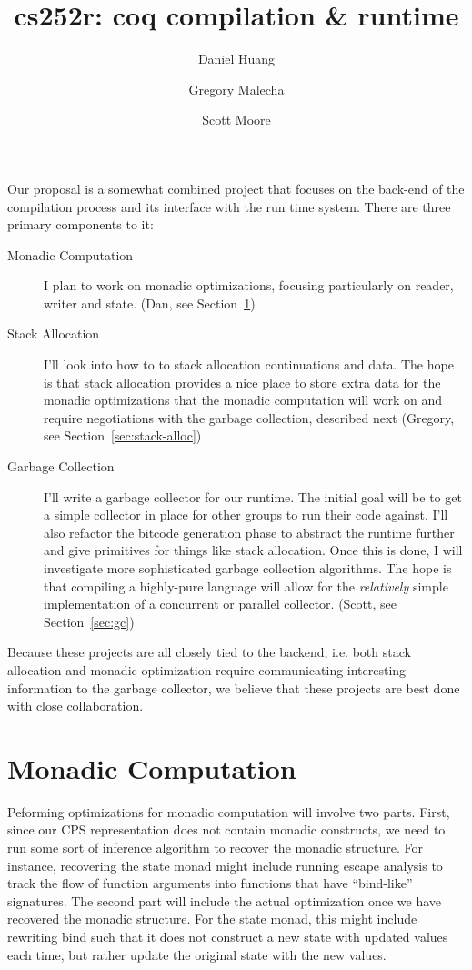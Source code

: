 \documentclass{article}
\title{cs252r: coq compilation \& runtime}
\author{Daniel Huang \and Gregory Malecha \and Scott Moore}
\begin{document}
\maketitle

Our proposal is a somewhat combined project that focuses on the back-end of the compilation process and its interface with the run time system. There are three primary components to it:

\begin{description}
\item[Monadic Computation] I plan to work on monadic optimizations,
  focusing particularly on reader, writer and state. (Dan, see Section~\ref{sec:mon-com})
\item[Stack Allocation] I'll look into how to to stack allocation continuations and data. The hope is that stack allocation provides a nice place to store extra data for the monadic optimizations that the monadic computation will work on and require negotiations with the garbage collection, described next (Gregory, see Section~\ref{sec:stack-alloc})
\item[Garbage Collection] I'll write a garbage collector for our runtime. The initial goal will be to get a simple collector in place for other groups to run their code against. I'll also refactor the bitcode generation phase to abstract the runtime further and give primitives for things like stack allocation. Once this is done, I will investigate more sophisticated garbage collection algorithms. The hope is that compiling a highly-pure language will allow for the \emph{relatively} simple implementation of a concurrent or parallel collector. (Scott, see Section~\ref{sec:gc})
\end{description} 

Because these projects are all closely tied to the backend, i.e. both stack allocation and monadic optimization require communicating interesting information to the garbage collector, we believe that these projects are best done with close collaboration.

\section{Monadic Computation}
\label{sec:mon-com}

Peforming optimizations for monadic computation will involve two
parts. First, since our CPS representation does not contain monadic
constructs, we need to run some sort of inference algorithm to recover
the monadic structure. For instance, recovering the state monad
might include running escape analysis to track the flow of function
arguments into functions that have ``bind-like'' signatures. The
second part will include the actual optimization once we have 
recovered the monadic structure. For the state monad, this might
include rewriting bind such that it does not construct a new state
with updated values each time, but rather update the original state
with the new values. 
\end{document}
